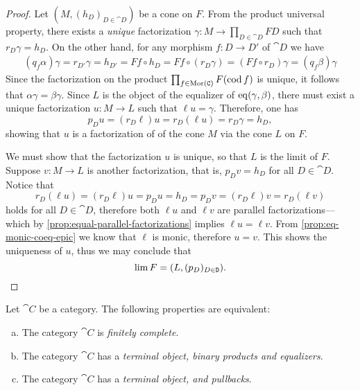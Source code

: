 \begin{proof}
Let \((M, (h_D)_{D \in \cat D})\) be a cone on \(F\). From the product universal
property, there exists a \emph{unique} factorization
\(\gamma: M \to \prod_{D \in \cat D} F D\) such that \(r_D \gamma = h_D\). On
the other hand, for any morphism \(f: D \to D'\) of \(\cat D\) we have
\begin{align*}
  (q_f \alpha) \gamma
  = r_{D'} \gamma
  = h_{D'}
  = F f \circ h_D
  = F f \circ (r_D \gamma)
  = (F f \circ r_D) \gamma
  = (q_f \beta) \gamma
\end{align*}
Since the factorization on the product \(\prod_{f \in \operatorname{Mor}(\texttt C)} F(\operatorname{cod}
f)\) is unique, it follows that \(\alpha \gamma = \beta \gamma\). Since \(L\) is
the object of the equalizer of \(\operatorname{eq}(\gamma, \beta)\), there must exist a unique
factorization \(u: M \to L\) such that \(\ell u = \gamma\). Therefore, one has
\[
p_D u  = (r_D \ell) u = r_D (\ell u) = r_D \gamma = h_D,
\]
showing that \(u\) is a factorization of of the cone \(M\) via the cone \(L\) on
\(F\).

We must show that the factorization \(u\) is unique, so that \(L\) is the limit
of \(F\). Suppose \(v: M \to L\) is another factorization, that is, \(p_D v =
h_D\) for all \(D \in \cat D\). Notice that
\[
r_D (\ell u)
= (r_D \ell) u
= p_D u
= h_D
= p_D v
= (r_D \ell) v
= r_D (\ell v)
\]
holds for all \(D \in \cat D\), therefore both \(\ell u\) and \(\ell v\) are parallel
factorizations---which by \cref{prop:equal-parallel-factorizations} implies
\(\ell u = \ell v\).  From \cref{prop:eq-monic-coeq-epic} we know that \(\ell\) is monic,
therefore \(u = v\). This shows the uniqueness of \(u\), thus we may conclude
that
\[
\operatorname{lim} F = (L, (p_D)_{D \in \texttt D}).
\]
\end{proof}

\begin{proposition}
\label{prop:equiv-cat-finitely-complete}
Let \(\cat C\) be a category. The following properties are equivalent:
\begin{enumerate}[(a)]\setlength\itemsep{0em}
\item The category \(\cat C\) is \emph{finitely complete}.
\item The category \(\cat C\) has a \emph{terminal object, binary
    products and equalizers}.
\item The category \(\cat C\) has a \emph{terminal object, and pullbacks}.
\end{enumerate}
\end{proposition}

